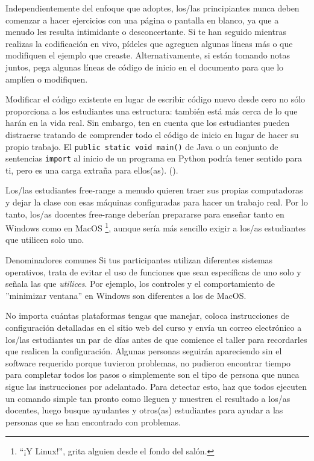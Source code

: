 Independientemente del enfoque que adoptes,
los/las principiantes nunca deben comenzar a hacer ejercicios con una página o pantalla en blanco,
ya que a menudo les resulta intimidante o desconcertante.
Si te han seguido mientras realizas la codificación en vivo,
pídeles que agreguen algunas líneas más
o que modifiquen el ejemplo que creaste.
Alternativamente, si están tomando notas juntos,
pega algunas líneas de código de inicio en el documento
para que lo amplíen o modifiquen.

Modificar el código existente en lugar de escribir código nuevo desde cero
no sólo proporciona a los estudiantes una estructura:
también está más cerca de lo que harán en la vida real.
Sin embargo,
ten en cuenta que los estudiantes pueden distraerse tratando de comprender todo el código de inicio
en lugar de hacer su propio trabajo.
El \texttt{public static void main()} de Java
o un conjunto de sentencias \texttt{import} al inicio de un programa en Python
podría tener sentido para ti,
pero es una carga extraña para ellos(as). ().


Los/las estudiantes free-range a menudo quieren traer sus propias computadoras
y dejar la clase con esas máquinas configuradas para hacer un trabajo real.
Por lo tanto, los/as docentes free-range deberían prepararse para enseñar tanto en Windows como en MacOS \footnote{``¡Y Linux!'', grita alguien desde el fondo del salón.},
aunque sería más sencillo exigir a los/as estudiantes que utilicen solo uno.

\begin{aside}{Denominadores comunes}
  Si tus participantes utilizan diferentes sistemas operativos,
  trata de evitar el uso de funciones que sean específicas de uno solo
  y señala las que \emph{utilices}.
  Por ejemplo,
  los controles y el comportamiento de ''minimizar ventana'' en Windows son diferentes
  a los de MacOS.
\end{aside}

No importa cuántas plataformas tengas que manejar,
coloca instrucciones de configuración detalladas en el sitio web del curso
y envía un correo electrónico a los/las estudiantes un par de días antes de que comience el taller
para recordarles que realicen la configuración.
Algunas personas seguirán apareciendo sin el software requerido porque
tuvieron problemas,
no pudieron encontrar tiempo para completar todos los pasos
o simplemente son el tipo de persona que nunca sigue las instrucciones por adelantado.
Para detectar esto,
haz que todos ejecuten un comando simple tan pronto como lleguen
y muestren el resultado a los/as docentes,
luego busque ayudantes y otros(as) estudiantes
para ayudar a las personas que se han encontrado con problemas.

